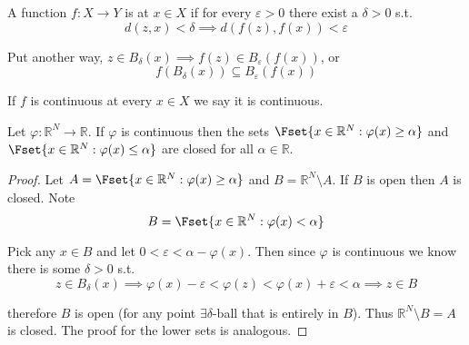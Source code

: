 \documentclass{article}
\begin{document}
\begin{figure}[H]
\end{figure}

\begin{definition}[continuity]\label{def:continuity_continuous}
  A function $f: X \to Y$ is  at $x \in X$ if for every $\varepsilon > 0$ there exist a $\delta > 0$ s.t.
  \[
    d(z, x) < \delta
    \implies
    d(f(z), f(x)) < \varepsilon
  \]

  Put another way, $z \in B_{\delta}(x) \implies f(z) \in B_{\varepsilon}(f(x))$, or
  \[
    f(B_{\delta}(x))
    \subseteq
    B_{\varepsilon}(f(x))
  \]

  If $f$ is continuous at every $x \in X$ we say it is continuous.
\end{definition}

\begin{proposition}
  Let $\varphi: \mathbb{R}^N \to \mathbb{R}$. If $\varphi$ is continuous then the sets $\Fset{x \in \mathbb{R}^N: \varphi(x) \ge \alpha}$ and $\Fset{x \in \mathbb{R}^N: \varphi(x)\le \alpha}$ are closed for all $\alpha \in \mathbb{R}$.
\end{proposition}

\begin{proof}
  Let $A = \Fset{x \in \mathbb{R}^N: \varphi(x) \ge \alpha}$ and $B = \mathbb{R}^N \setminus A$. If $B$ is open then $A$ is closed. Note
  \[
    B = \Fset{
      x \in \mathbb{R}^N: \varphi(x) < \alpha
    }
  \]

  Pick any $x \in B$ and let $0 < \varepsilon < \alpha - \varphi(x)$. Then since $\varphi$ is continuous we know there is some $\delta > 0$ s.t.
  \[
    z \in B_{\delta}(x)
    \implies
    \varphi(x) - \varepsilon
    <
    \varphi(z)
    <
    \varphi(x) + \varepsilon
    <
    \alpha
    \implies
    z \in B
  \]

  therefore $B$ is open (for any point $\exists \delta$-ball that is entirely in $B$). Thus $\mathbb{R}^N \setminus B = A$ is closed. The proof for the lower sets is analogous.
\end{proof}
\end{document}
